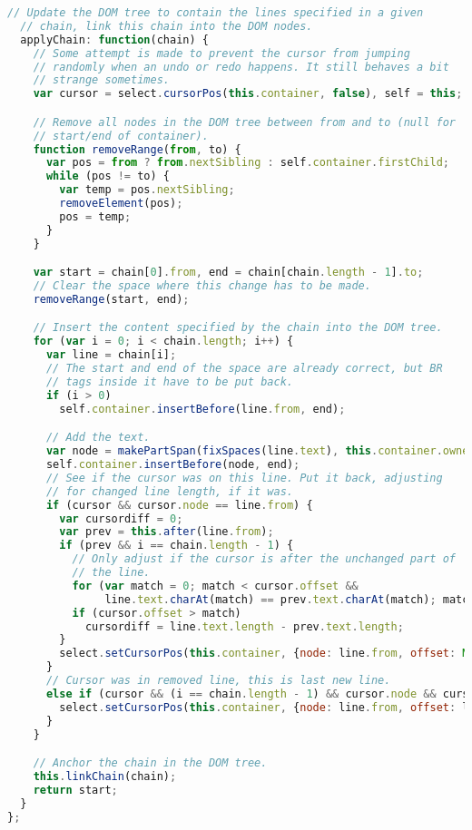 \begin{lstlisting}[language=Javascript]
  // Update the DOM tree to contain the lines specified in a given
  // chain, link this chain into the DOM nodes.
  applyChain: function(chain) {
    // Some attempt is made to prevent the cursor from jumping
    // randomly when an undo or redo happens. It still behaves a bit
    // strange sometimes.
    var cursor = select.cursorPos(this.container, false), self = this;

    // Remove all nodes in the DOM tree between from and to (null for
    // start/end of container).
    function removeRange(from, to) {
      var pos = from ? from.nextSibling : self.container.firstChild;
      while (pos != to) {
        var temp = pos.nextSibling;
        removeElement(pos);
        pos = temp;
      }
    }

    var start = chain[0].from, end = chain[chain.length - 1].to;
    // Clear the space where this change has to be made.
    removeRange(start, end);

    // Insert the content specified by the chain into the DOM tree.
    for (var i = 0; i < chain.length; i++) {
      var line = chain[i];
      // The start and end of the space are already correct, but BR
      // tags inside it have to be put back.
      if (i > 0)
        self.container.insertBefore(line.from, end);

      // Add the text.
      var node = makePartSpan(fixSpaces(line.text), this.container.ownerDocument);
      self.container.insertBefore(node, end);
      // See if the cursor was on this line. Put it back, adjusting
      // for changed line length, if it was.
      if (cursor && cursor.node == line.from) {
        var cursordiff = 0;
        var prev = this.after(line.from);
        if (prev && i == chain.length - 1) {
          // Only adjust if the cursor is after the unchanged part of
          // the line.
          for (var match = 0; match < cursor.offset &&
               line.text.charAt(match) == prev.text.charAt(match); match++);
          if (cursor.offset > match)
            cursordiff = line.text.length - prev.text.length;
        }
        select.setCursorPos(this.container, {node: line.from, offset: Math.max(0, cursor.offset + cursordiff)});
      }
      // Cursor was in removed line, this is last new line.
      else if (cursor && (i == chain.length - 1) && cursor.node && cursor.node.parentNode != this.container) {
        select.setCursorPos(this.container, {node: line.from, offset: line.text.length});
      }
    }

    // Anchor the chain in the DOM tree.
    this.linkChain(chain);
    return start;
  }
};
\end{lstlisting}

